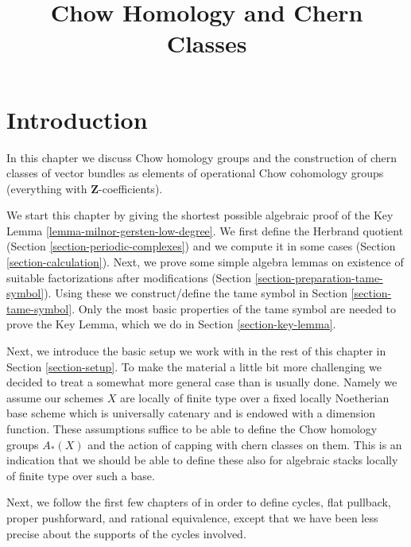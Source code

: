 

%


\title{Chow Homology and Chern Classes}

\maketitle

\label{section-phantom}


\tableofcontents


\section{Introduction}
\label{section-introduction}

\noindent
In this chapter we discuss Chow homology groups and the construction
of chern classes of vector bundles as elements of operational
Chow cohomology groups (everything with $\mathbf{Z}$-coefficients).

\medskip\noindent
We start this chapter by giving the shortest possible
algebraic proof of the Key Lemma \ref{lemma-milnor-gersten-low-degree}.
We first define the Herbrand quotient
(Section \ref{section-periodic-complexes})
and we compute it in some cases
(Section \ref{section-calculation}).
Next, we prove some simple algebra lemmas on
existence of suitable factorizations after modifications
(Section \ref{section-preparation-tame-symbol}).
Using these we construct/define the tame symbol in
Section \ref{section-tame-symbol}.
Only the most basic properties of the tame symbol
are needed to prove the Key Lemma, which we do
in Section \ref{section-key-lemma}.

\medskip\noindent
Next, we introduce the basic setup we work with in the rest of this
chapter in Section \ref{section-setup}. To make the material a little
bit more challenging we decided to treat a somewhat more general case
than is usually done. Namely we assume our schemes $X$ are locally of
finite type over a fixed locally Noetherian base scheme which is universally
catenary and is endowed with a dimension function. These assumptions suffice
to be able to define the Chow homology groups $A_*(X)$ and the action of
capping with chern classes on them. This is an indication that we should
be able to define these also for algebraic stacks locally of finite type
over such a base.

\medskip\noindent
Next, we follow the first few chapters of \cite{F} in order to define
cycles, flat pullback, proper pushforward, and rational equivalence,
except that we have been less precise about the supports of the cycles
involved.

